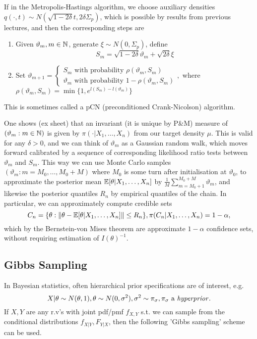 \documentclass[a4paper]{article}
\begin{document}
If in the Metropolis-Hastings algorithm, we choose auxiliary densities $q(\cdot ,t) \sim N(\sqrt{1-2\delta}t, 2\delta \Sigma_p )$, which is possible by results from previous lectures, and then the corresponding steps are
\begin{enumerate}
	\item Given $\vartheta_m, m \in \mathbb{N}$, generate $\xi \sim N(0, \Sigma_p)$, define
		 \[
		S_m = \sqrt{1-2\delta} \vartheta_m + \sqrt{2\delta} \xi 
		\]
	\item Set $\vartheta_{m+1} = \begin{cases}
			S_m \text{ with probability } \rho(\vartheta_m, S_m) \\
			\vartheta_m \text{ with probability } 1 - \rho(\vartheta_m, S_m)
	\end{cases},$ 
	where $\rho(\vartheta_m, S_m) = \min\{1, e^{l(S_m) - l(\vartheta_m)}\}$
\end{enumerate}
This is sometimes called a pCN (preconditioned Crank-Nicolson) algorithm.

One shows (ex sheet) that an invariant (it is unique by P\&M) measure of $(\vartheta_m: m \in \mathbb{N})$ is given by $\pi(\cdot |X_1, \ldots, X_n)$ from our target density $\mu$. This is valid for any $\delta > 0$, and we can think of $\vartheta_m$ as a Gaussian random walk, which moves forward calibrated by a sequence of corresponding likelihood ratio tests between $\vartheta_m$ and $S_m$. This way we can use Monte Carlo samples $(\vartheta_m : m=M_0, \ldots, M_0+M)$ where $M_0$ is some turn after initialisation at $\vartheta_0$, to approximate the posterior mean $\mathbb{E} [\theta |X_1,\ldots,X_n]$ by $\frac{1}{M}\sum_{m=M_0+1}^{M_0+M} \vartheta_m$, and likewise the posterior quantiles $R_n$ by empirical quantiles of the chain. In particular, we can approximately compute credible sets 
\[
	C_n = \{\theta : \|\theta - \mathbb{E} [\theta|X_1,\ldots,X_n]\| \le R_n\}, \pi(C_n|X_1,\ldots,X_n) = 1-\alpha
,\] which by the Bernstein-von Mises theorem are approximate $1-\alpha$ confidence sets, without requiring estimation of $I(\theta)^{-1}$.

\subsection{Gibbs Sampling}

In Bayesian statistics, often hierarchical prior specifications are of interest, e.g.
\[
	X|\theta \sim N(\theta,1), \theta \sim N(0, \sigma^2), \sigma^2 \sim \pi_{\sigma}, \pi_{\sigma} \text{ a \textit{hyperprior}}
.\]
If $X, Y$ are any r.v's with joint pdf/pmf $f_{X,Y}$ s.t. we can sample from the conditional distributions $f_{X|Y}, F_{Y|X}$, then the following 'Gibbs sampling' scheme can be used.
\end{document}
